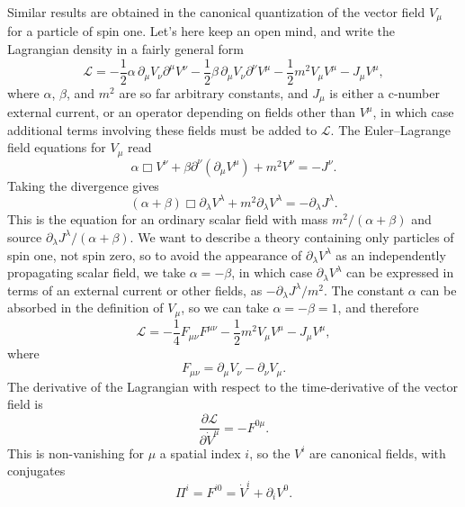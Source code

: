 Similar results are obtained in the canonical quantization of the vector
field $V_\mu$ for a particle of spin one. Let's here keep an open mind, and
write the Lagrangian density in a fairly general form
\begin{equation}
\mathcal L=-\frac12\alpha\,\partial_\mu V_\nu\partial^\mu V^\nu
-\frac12\beta\,\partial_\mu V_\nu\partial^\nu V^\mu
-\frac12m^2V_\mu V^\mu-J_\mu V^\mu,
\tag{7.5.9}\label{eq:7.5.9}
\end{equation}
where $\alpha$, $\beta$, and $m^2$ are so far arbitrary constants, and
$J_\mu$ is either a c-number external current, or an operator depending on
fields other than $V^\mu$, in which case additional terms involving these
fields must be added to $\mathcal L$. The Euler--Lagrange field equations for
$V_\mu$ read
\[
\alpha\Box V^\nu+\beta\partial^\nu(\partial_\mu V^\mu)+m^2V^\nu=-J^\nu.
\]
Taking the divergence gives
\begin{equation}
(\alpha+\beta)\Box\partial_\lambda V^\lambda
+m^2\partial_\lambda V^\lambda=-\partial_\lambda J^\lambda.
\tag{7.5.10}\label{eq:7.5.10}
\end{equation}
This is the equation for an ordinary scalar field with mass
$m^2/(\alpha+\beta)$ and source $\partial_\lambda J^\lambda/(\alpha+\beta)$.
We want to describe a theory containing only particles of spin one, not spin
zero, so to avoid the appearance of $\partial_\lambda V^\lambda$ as an
independently propagating scalar field, we take $\alpha=-\beta$, in which case
$\partial_\lambda V^\lambda$ can be expressed in terms of an external current
or other fields, as $-\partial_\lambda J^\lambda/m^2$. The constant $\alpha$
can be absorbed in the definition of $V_\mu$, so we can take
$\alpha=-\beta=1$, and therefore
\begin{equation}
\mathcal L=-\frac14F_{\mu\nu}F^{\mu\nu}
-\frac12m^2V_\mu V^\mu-J_\mu V^\mu,
\tag{7.5.11}\label{eq:7.5.11}
\end{equation}
where
\begin{equation}
F_{\mu\nu}=\partial_\mu V_\nu-\partial_\nu V_\mu.
\tag{7.5.12}\label{eq:7.5.12}
\end{equation}
The derivative of the Lagrangian with respect to the time-derivative of the
vector field is
\begin{equation}
\frac{\partial\mathcal L}{\partial\dot V^\mu}=-F^{0\mu}.
\tag{7.5.13}\label{eq:7.5.13}
\end{equation}
This is non-vanishing for $\mu$ a spatial index $i$, so the $V^i$ are
canonical fields, with conjugates
\begin{equation}
\Pi^i=F^{i0}=\dot V^i+\partial_iV^0.
\tag{7.5.14}\label{eq:7.5.14}
\end{equation}

